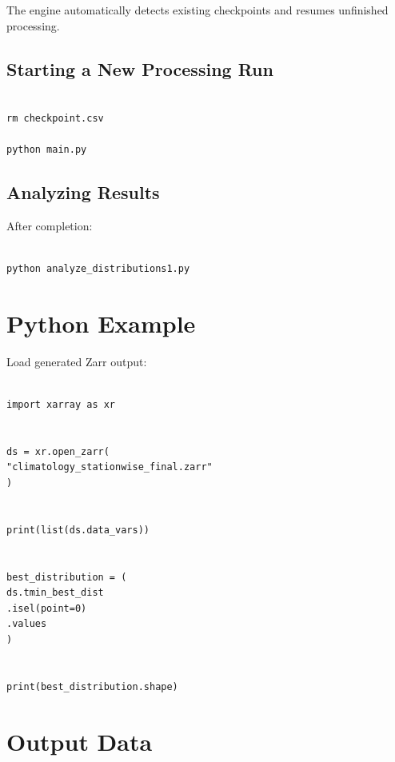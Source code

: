 \documentclass[11pt,a4paper]{article}
\begin{document}
The engine automatically detects existing checkpoints and resumes
unfinished processing.



\subsection{Starting a New Processing Run}



\begin{verbatim}

rm checkpoint.csv

python main.py

\end{verbatim}



\subsection{Analyzing Results}



After completion:


\begin{verbatim}

python analyze_distributions1.py

\end{verbatim}



\section{Python Example}



Load generated Zarr output:


\begin{verbatim}

import xarray as xr


ds = xr.open_zarr(
"climatology_stationwise_final.zarr"
)


print(list(ds.data_vars))


best_distribution = (
ds.tmin_best_dist
.isel(point=0)
.values
)


print(best_distribution.shape)

\end{verbatim}




\section{Output Data}
\end{document}
